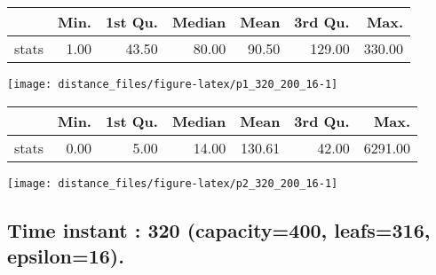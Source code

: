 \documentclass[
  9pt,
  landscape]{article}
\begin{document}
\begin{minipage}{0.5\textwidth} 
\centering 
\begin{tabular}{rrrrrrr}
  \hline
 & Min. & 1st Qu. & Median & Mean & 3rd Qu. & Max. \\ 
  \hline
stats & 1.00 & 43.50 & 80.00 & 90.50 & 129.00 & 330.00 \\ 
   \hline
\end{tabular}
\vspace{0.5cm} 


\texttt{[image: distance\_files/figure-latex/p1\_320\_200\_16-1]} 

\end{minipage} 
\begin{minipage}{0.5\textwidth} 
\centering 
\begin{tabular}{rrrrrrr}
  \hline
 & Min. & 1st Qu. & Median & Mean & 3rd Qu. & Max. \\ 
  \hline
stats & 0.00 & 5.00 & 14.00 & 130.61 & 42.00 & 6291.00 \\ 
   \hline
\end{tabular}
\vspace{0.5cm} 


\texttt{[image: distance\_files/figure-latex/p2\_320\_200\_16-1]} 

\end{minipage}

\pagebreak

\hypertarget{time-instant-320-capacity400-leafs316-epsilon16.}{%
\subsection{Time instant : 320 (capacity=400, leafs=316,
epsilon=16).}\label{time-instant-320-capacity400-leafs316-epsilon16.}}
\end{document}
